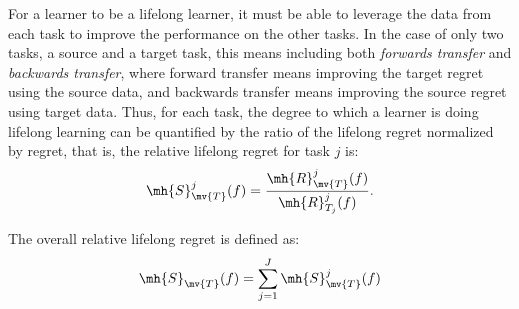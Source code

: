 \documentclass{article}
\begin{document}
For a learner to be a lifelong learner, it must be able to leverage the data from each task to improve the performance on the other tasks. In the case of only two tasks, a source and a target task, this means including both \emph{forwards transfer} and \emph{backwards transfer}, where forward transfer means improving the target regret using the source data, and backwards transfer means improving the source regret using target data.  
Thus, for each task, the degree to which a learner is doing lifelong learning can be quantified by the ratio of the lifelong regret normalized by regret, that is, the relative lifelong regret for task $j$ is:
\begin{align}
    \mh{S}^j_{\mv{T}}(f) = 
    \frac{ \mh{R}^j_{\mv{T}}(f) } {\mh{R}^j_{T_j}(f) }.
\end{align}



The overall relative lifelong regret is defined as:
\begin{align}
    \mh{S}_{\mv{T}}(f) = \sum_{j=1}^J \mh{S}^j_{\mv{T}}(f)
\end{align}

\end{document}
